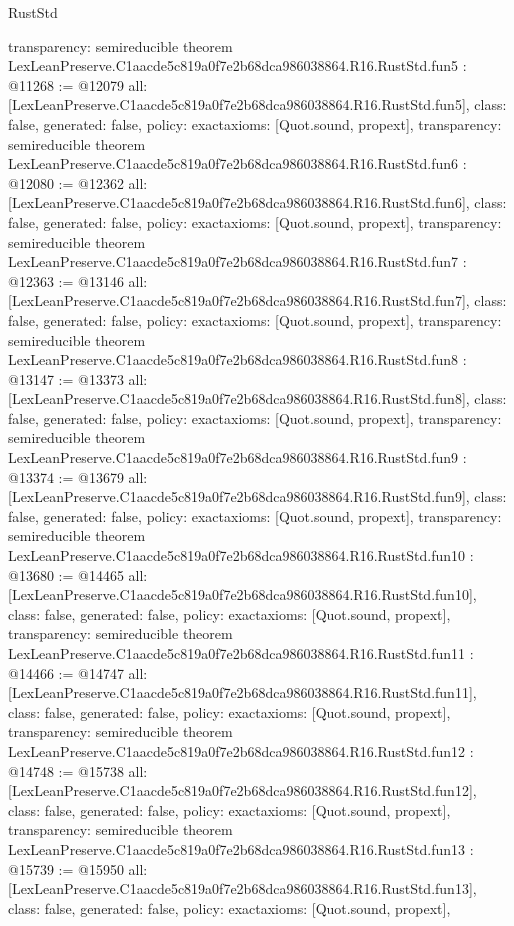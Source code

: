 \begin{lexlean}{RustStd}
\begin{coremodule}
{  transparency: semireducible
}
theorem LexLeanPreserve.C1aacde5c819a0f7e2b68dca986038864.R16.RustStd.fun5 : @11268 := @12079 {
  all: [LexLeanPreserve.C1aacde5c819a0f7e2b68dca986038864.R16.RustStd.fun5],
  class: false,
  generated: false,
  policy: exact{axioms: [Quot.sound, propext]},
  transparency: semireducible
}
theorem LexLeanPreserve.C1aacde5c819a0f7e2b68dca986038864.R16.RustStd.fun6 : @12080 := @12362 {
  all: [LexLeanPreserve.C1aacde5c819a0f7e2b68dca986038864.R16.RustStd.fun6],
  class: false,
  generated: false,
  policy: exact{axioms: [Quot.sound, propext]},
  transparency: semireducible
}
theorem LexLeanPreserve.C1aacde5c819a0f7e2b68dca986038864.R16.RustStd.fun7 : @12363 := @13146 {
  all: [LexLeanPreserve.C1aacde5c819a0f7e2b68dca986038864.R16.RustStd.fun7],
  class: false,
  generated: false,
  policy: exact{axioms: [Quot.sound, propext]},
  transparency: semireducible
}
theorem LexLeanPreserve.C1aacde5c819a0f7e2b68dca986038864.R16.RustStd.fun8 : @13147 := @13373 {
  all: [LexLeanPreserve.C1aacde5c819a0f7e2b68dca986038864.R16.RustStd.fun8],
  class: false,
  generated: false,
  policy: exact{axioms: [Quot.sound, propext]},
  transparency: semireducible
}
theorem LexLeanPreserve.C1aacde5c819a0f7e2b68dca986038864.R16.RustStd.fun9 : @13374 := @13679 {
  all: [LexLeanPreserve.C1aacde5c819a0f7e2b68dca986038864.R16.RustStd.fun9],
  class: false,
  generated: false,
  policy: exact{axioms: [Quot.sound, propext]},
  transparency: semireducible
}
theorem LexLeanPreserve.C1aacde5c819a0f7e2b68dca986038864.R16.RustStd.fun10 : @13680 := @14465 {
  all: [LexLeanPreserve.C1aacde5c819a0f7e2b68dca986038864.R16.RustStd.fun10],
  class: false,
  generated: false,
  policy: exact{axioms: [Quot.sound, propext]},
  transparency: semireducible
}
theorem LexLeanPreserve.C1aacde5c819a0f7e2b68dca986038864.R16.RustStd.fun11 : @14466 := @14747 {
  all: [LexLeanPreserve.C1aacde5c819a0f7e2b68dca986038864.R16.RustStd.fun11],
  class: false,
  generated: false,
  policy: exact{axioms: [Quot.sound, propext]},
  transparency: semireducible
}
theorem LexLeanPreserve.C1aacde5c819a0f7e2b68dca986038864.R16.RustStd.fun12 : @14748 := @15738 {
  all: [LexLeanPreserve.C1aacde5c819a0f7e2b68dca986038864.R16.RustStd.fun12],
  class: false,
  generated: false,
  policy: exact{axioms: [Quot.sound, propext]},
  transparency: semireducible
}
theorem LexLeanPreserve.C1aacde5c819a0f7e2b68dca986038864.R16.RustStd.fun13 : @15739 := @15950 {
  all: [LexLeanPreserve.C1aacde5c819a0f7e2b68dca986038864.R16.RustStd.fun13],
  class: false,
  generated: false,
  policy: exact{axioms: [Quot.sound, propext]},
}
\end{coremodule}
\end{lexlean}
